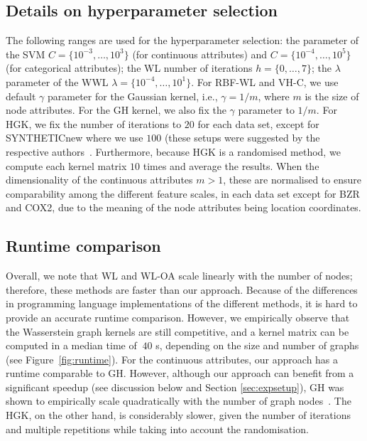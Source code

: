 \documentclass{article}
\begin{document}
\subsection{Details on hyperparameter selection}
\label{app:hypersel}
The following ranges are used for the hyperparameter selection: the parameter of the SVM $C = \{10^{-3},\ldots, 10^{3}\}$ (for continuous attributes) and $C = \{10^{-4},\ldots, 10^{5}\}$ (for categorical attributes); the WL number of iterations $h=\{0,\ldots, 7\}$; the $\lambda$ parameter of the WWL $\lambda=\{10^{-4},\dots,10^{1}\}$. For RBF-WL and VH-C, we use default $\gamma$ parameter for the Gaussian kernel, i.e., $\gamma = 1/m$, where $m$ is the size of node attributes. 
For the GH kernel, we also fix the $\gamma$ parameter to $1/m$. For HGK, we fix the number of iterations to $20$ for each data set, except for SYNTHETICnew where we use $100$ (these setups were suggested by the respective authors~\citep{morris2016faster,feragen2013scalable}. Furthermore, because HGK is a randomised method, we compute each kernel matrix $10$ times and average the results. 
When the dimensionality of the continuous attributes $m>1$, these are normalised to ensure comparability among the different feature scales, in each data set except for BZR and COX2, due to the meaning of the node attributes being location coordinates. 


\subsection{Runtime comparison}
\label{app:runtime}

Overall, we note that WL and WL-OA scale linearly with the number of nodes; therefore, these methods are faster than our approach. Because of the differences in programming language implementations of the different methods, it is hard to provide an accurate runtime comparison. However, we empirically observe that the Wasserstein graph kernels are still competitive, and a kernel matrix can be computed in a median time of $~40$ s, depending on the size and number of graphs (see Figure~\ref{fig:runtime}). For the continuous attributes, our approach has a runtime comparable to GH. However, although our approach can benefit from a significant speedup (see discussion below and Section \ref{sec:expsetup}), GH was shown to empirically scale quadratically with the number of graph nodes~\citep{feragen2013scalable}. The HGK, on the other hand, is considerably slower, given the number of iterations and multiple repetitions while taking into account the randomisation.
\end{document}
